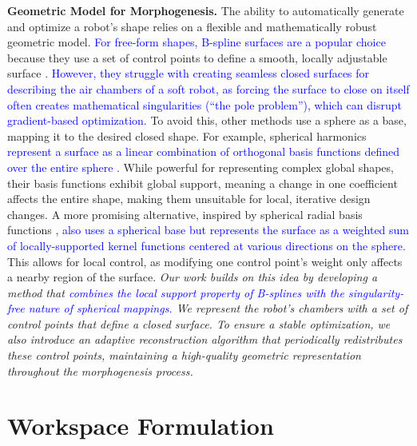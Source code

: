 \documentclass[journal]{IEEEtran}
\theoremstyle{definition}
\begin{document}
\textbf{Geometric Model for Morphogenesis.}
The ability to automatically generate and optimize a robot's shape relies on a flexible and mathematically robust geometric model. \textcolor{blue}{For free-form shapes, B-spline surfaces are a popular choice} because they use a set of control points to define a smooth, locally adjustable surface \cite{doi:10.2514/1.J055102, chen_morphological_2023, Mosser2023}. \textcolor{blue}{However, they struggle with creating seamless closed surfaces for describing the air chambers of a soft robot, as forcing the surface to close on itself often creates mathematical singularities (``the pole problem''), which can disrupt gradient-based optimization.} To avoid this, other methods use a sphere as a base, mapping it to the desired closed shape. For example, spherical harmonics \textcolor{blue}{represent a surface as a linear combination of orthogonal basis functions defined over the entire sphere \cite{Yotter_Nenadic_Ziegler_Thompson_Gaser_2011}}. While powerful for representing complex global shapes, their basis functions exhibit global support, meaning a change in one coefficient affects the entire shape, making them unsuitable for local, iterative design changes. A more promising alternative, inspired by spherical radial basis functions \cite{Currius_Dolonius_Assarsson_Sintorn_2020, 10.1145/1141911.1141981, Flyer_Wright_2007}, \textcolor{blue}{also uses a spherical base but represents the surface as a weighted sum of locally-supported kernel functions centered at various directions on the sphere.} This allows for local control, as modifying one control point's weight only affects a nearby region of the surface. \textit{Our work builds on this idea by developing a method that \textcolor{blue}{combines the local support property of B-splines with the singularity-free nature of spherical mappings.} We represent the robot's chambers with a set of control points that define a closed surface. To ensure a stable optimization, we also introduce an adaptive reconstruction algorithm that periodically redistributes these control points, maintaining a high-quality geometric representation throughout the morphogenesis process.}

\section{Workspace Formulation}
\label{sec:workspace_formulate}
\end{document}
